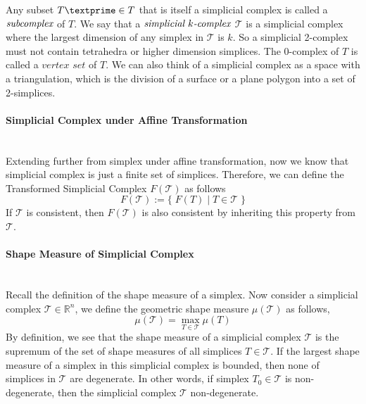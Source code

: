     Any subset ${T\textprime}\in{T}$ that is itself a simplicial complex is called a $\emph{subcomplex}$ of ${T}$. We say that a $\emph{simplicial $k$-complex}$ $\mathcal T$ is a simplicial complex where the largest dimension of any simplex in $\mathcal T$ is ${k}$. So a simplicial 2-complex must not contain tetrahedra or higher dimension simplices. The 0-complex of ${T}$ is called a $\textit{vertex set}$ of ${T}$. We can also think of a simplicial complex as a space with a triangulation, which is the division of a surface or a plane polygon into a set of 2-simplices. 

    \paragraph{Simplicial Complex under Affine Transformation}\mbox{}\\
    Extending further from simplex under affine transformation, now we know that simplicial complex is just a finite set of simplices. Therefore, we can define the Transformed Simplicial Complex $F(\mathcal{T})$ as follows
    \begin{equation*}
    F(\mathcal{T}) := \{ \; F(T) \;\vert\; T \in \mathcal{T} \; \}
    \end{equation*}
    If $\mathcal{T}$ is consistent, then $F(\mathcal{T})$ is also consistent by inheriting this property from $\mathcal{T}$.

    \paragraph{Shape Measure of Simplicial Complex}\mbox{}\\
    Recall the definition of the shape measure of a simplex.
    Now consider a simplicial complex $\mathcal{T}\in\mathbb{R}^n$, we define the geometric shape measure $\mu(\mathcal{T})$ as follows,
    \begin{equation*}
    \mu(\mathcal{T}) = \max_{T \in \mathcal{T}} \mu(T)
    \end{equation*}
    By definition, we see that the shape measure of a simplicial complex $\mathcal{T}$ is the supremum of the set of shape measures of all simplices $T\in\mathcal{T}$. If the largest shape measure of a simplex in this simplicial complex is bounded, then none of simplices in $\mathcal{T}$ are degenerate. In other words, if simplex $T_0 \in\mathcal{T}$ is non-degenerate, then the simplicial complex $\mathcal{T}$ non-degenerate.
